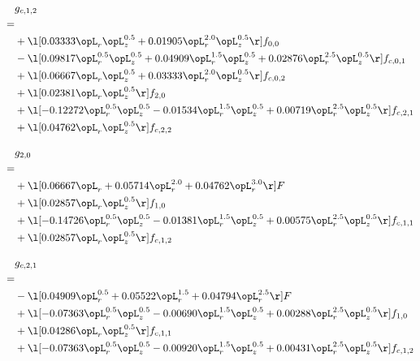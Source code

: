 \begin{alignat}{2} 
\label{eq:g_12_0} 
& g_{c,1,2} \nonumber \\ 
 = \\ 
& + \l[  0.03333 \opL_r \opL_z^{0.5} +  0.01905 \opL_r^{2.0} \opL_z^{0.5}  \r] f_{0,0} \nonumber \\ 
& - \l[  0.09817 \opL_r^{0.5} \opL_z^{0.5} +  0.04909 \opL_r^{1.5} \opL_z^{0.5} +  0.02876 \opL_r^{2.5} \opL_z^{0.5}  \r] f_{c,0,1} \nonumber \\ 
& + \l[  0.06667 \opL_r \opL_z^{0.5} +  0.03333 \opL_r^{2.0} \opL_z^{0.5}  \r] f_{c,0,2} \nonumber \\ 
& + \l[  0.02381 \opL_r \opL_z^{0.5}  \r] f_{2,0} \nonumber \\ 
& + \l[  -0.12272 \opL_r^{0.5} \opL_z^{0.5}   -0.01534 \opL_r^{1.5} \opL_z^{0.5} +  0.00719 \opL_r^{2.5} \opL_z^{0.5}  \r] f_{c,2,1} \nonumber \\ 
& + \l[  0.04762 \opL_r \opL_z^{0.5}  \r] f_{c,2,2} \nonumber \\ 
\end{alignat} 


\begin{alignat}{2} 
\label{eq:g_20_0} 
& g_{2,0} \nonumber \\ 
 = \\ 
& + \l[  0.06667 \opL_r +  0.05714 \opL_r^{2.0} +  0.04762 \opL_r^{3.0}  \r] F \nonumber \\ 
& + \l[  0.02857 \opL_r \opL_z^{0.5}  \r] f_{1,0} \nonumber \\ 
& + \l[  -0.14726 \opL_r^{0.5} \opL_z^{0.5}   -0.01381 \opL_r^{1.5} \opL_z^{0.5} +  0.00575 \opL_r^{2.5} \opL_z^{0.5}  \r] f_{c,1,1} \nonumber \\ 
& + \l[  0.02857 \opL_r \opL_z^{0.5}  \r] f_{c,1,2} \nonumber \\ 
\end{alignat} 


\begin{alignat}{2} 
\label{eq:g_21_0} 
& g_{c,2,1} \nonumber \\ 
 = \\ 
& - \l[  0.04909 \opL_r^{0.5} +  0.05522 \opL_r^{1.5} +  0.04794 \opL_r^{2.5}  \r] F \nonumber \\ 
& + \l[  -0.07363 \opL_r^{0.5} \opL_z^{0.5}   -0.00690 \opL_r^{1.5} \opL_z^{0.5} +  0.00288 \opL_r^{2.5} \opL_z^{0.5}  \r] f_{1,0} \nonumber \\ 
& + \l[  0.04286 \opL_r \opL_z^{0.5}  \r] f_{c,1,1} \nonumber \\ 
& + \l[  -0.07363 \opL_r^{0.5} \opL_z^{0.5}   -0.00920 \opL_r^{1.5} \opL_z^{0.5} +  0.00431 \opL_r^{2.5} \opL_z^{0.5}  \r] f_{c,1,2} \nonumber \\ 
\end{alignat} 


